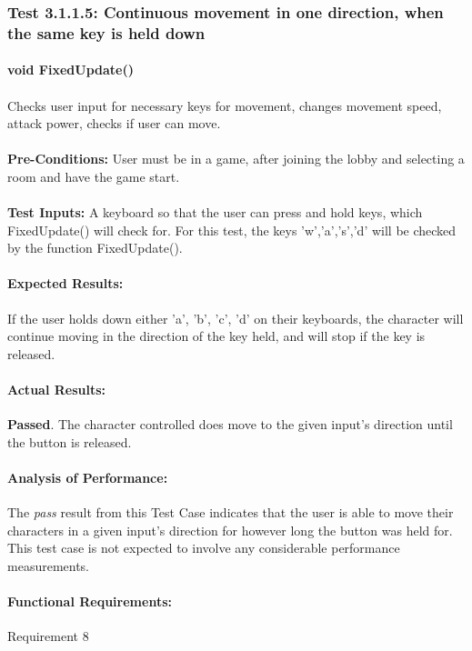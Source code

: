 \documentclass{article}
\begin{document}
    \subsubsection{Test 3.1.1.5: Continuous movement in one direction, when the same key is held down}
    \paragraph{}\textbf{void FixedUpdate()}
    \paragraph{} Checks user input for necessary keys for movement, changes movement speed, attack power, checks if user can move.
    \paragraph{}\textbf{Pre-Conditions:} User must be in a game, after joining the lobby and selecting a room and have the game start.
    \paragraph{}\textbf{Test Inputs:} A keyboard so that the user can press and hold keys, which FixedUpdate() will check for. For this test, the keys 'w','a','s','d' will be checked by the function FixedUpdate(). 
    \paragraph{Expected Results:} If the user holds down either 'a', 'b', 'c', 'd' on their keyboards, the character will continue moving in the direction of the key held, and will stop if the key is released.
    \paragraph{Actual Results:} \textbf{Passed}. The character controlled does move to the given input's direction until the button is released. 
    \paragraph{Analysis of Performance:} The \emph{pass} result from this Test Case indicates that the user is able to move their characters in a given input's direction for however long the button was held for. This test case is not expected to involve any considerable performance measurements.
    \paragraph{Functional Requirements:} Requirement 8
\end{document}
